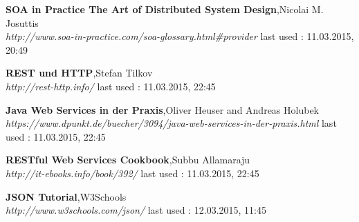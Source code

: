 \documentclass[12pt]{article}
\begin{document}
\begin{thebibliography}{56}
   \textbf{SOA in Practice
The Art of Distributed System Design},Nicolai M. Josuttis\\
  \textit{http://www.soa-in-practice.com/soa-glossary.html\#provider}
  \newline last used : 11.03.2015, 20:49 

  \textbf{REST und HTTP},Stefan Tilkov\\
  \textit{http://rest-http.info/}
  \newline last used : 11.03.2015, 22:45 

  \textbf{Java Web Services in der Praxis},Oliver Heuser and Andreas Holubek\\
  \textit{https://www.dpunkt.de/buecher/3094/java-web-services-in-der-praxis.html}
  \newline last used : 11.03.2015, 22:45

  \textbf{RESTful Web Services Cookbook},Subbu Allamaraju\\
  \textit{http://it-ebooks.info/book/392/}
  \newline last used : 11.03.2015, 22:45

  \textbf{JSON Tutorial},W3Schools\\
  \textit{http://www.w3schools.com/json/}
  \newline last used : 12.03.2015, 11:45


 	 
 	 
 	 
 	 
\end{thebibliography}
\end{document}
